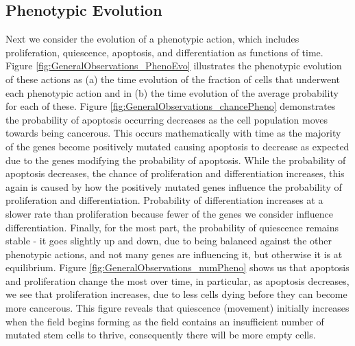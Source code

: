 \documentclass[\main/thesis.tex]{subfiles}
\begin{document}
\subsection{Phenotypic Evolution}
Next we consider the evolution of a phenotypic action, which includes proliferation, quiescence, apoptosis, and differentiation as functions of time. 
Figure \ref{fig:GeneralObservations_PhenoEvo} illustrates the phenotypic evolution of these actions as (a) the time evolution of the fraction of cells that underwent each phenotypic action and in (b) the time evolution of the average probability for each of these. Figure \ref{fig:GeneralObservations_chancePheno} demonstrates the probability of apoptosis occurring decreases as the cell population moves towards being cancerous. This occurs mathematically with time as the majority of the genes become positively mutated causing apoptosis to decrease as expected due to the genes modifying the probability of apoptosis. While the probability of apoptosis decreases, the chance of proliferation and differentiation increases, this again is caused by how the positively mutated genes influence the probability of proliferation and differentiation. Probability of differentiation increases at a slower rate than proliferation because fewer of the genes we consider influence differentiation. Finally, for the most part, the probability of quiescence remains stable - it goes slightly up and down, due to being balanced against the other phenotypic actions, and not many genes are influencing it, but otherwise it is at equilibrium. Figure \ref{fig:GeneralObservations_numPheno} shows us that apoptosis and proliferation change the most over time, in particular, as apoptosis decreases, we see that proliferation increases, due to less cells dying before they can become more cancerous. This figure reveals that quiescence (movement) initially increases when the field begins forming as the field contains an insufficient number of mutated stem cells to thrive, consequently there will be more empty cells.
\end{document}
